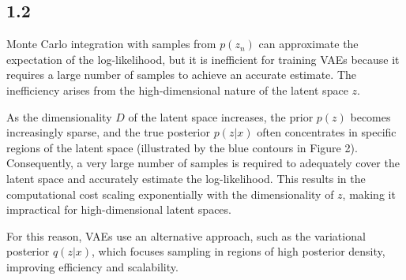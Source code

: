 \documentclass{article}
\begin{document}
\subsection*{1.2}




Monte Carlo integration with samples from \( p(z_n) \) can approximate the expectation of the log-likelihood, but it is inefficient for training VAEs because it requires a large number of samples to achieve an accurate estimate. The inefficiency arises from the high-dimensional nature of the latent space \( z \).

As the dimensionality \( D \) of the latent space increases, the prior \( p(z) \) becomes increasingly sparse, and the true posterior \( p(z|x) \) often concentrates in specific regions of the latent space (illustrated by the blue contours in Figure 2). Consequently, a very large number of samples is required to adequately cover the latent space and accurately estimate the log-likelihood. This results in the computational cost scaling exponentially with the dimensionality of \( z \), making it impractical for high-dimensional latent spaces.

For this reason, VAEs use an alternative approach, such as the variational posterior \( q(z|x) \), which focuses sampling in regions of high posterior density, improving efficiency and scalability.
\end{document}
